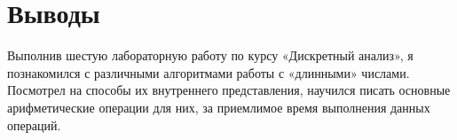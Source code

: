 \section{Выводы}

Выполнив шестую лабораторную работу по курсу «Дискретный анализ», я познакомился с различными алгоритмами работы с «длинными» числами. Посмотрел на
способы их внутреннего представления, научился писать основные арифметические операции для них, за приемлимое время выполнения данных операций.

\pagebreak

